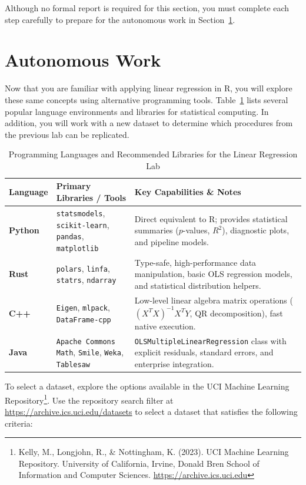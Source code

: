 \documentclass{article}
\begin{document}
Although no formal report is required for this section, you must complete each step carefully to prepare for the autonomous work in Section~\ref{sec:work}.

\section{Autonomous Work}
\label{sec:work}

Now that you are familiar with applying linear regression in R, you will explore these same concepts using alternative programming tools. Table~\ref{tab:languages} lists several popular language environments and libraries for statistical computing. In addition, you will work with a new dataset to determine which procedures from the previous lab can be replicated.

\begin{table}[htbp]
  \centering
  \caption{Programming Languages and Recommended Libraries for the Linear Regression Lab}
  \label{tab:languages}
  \small
  \begin{tabularx}{\textwidth}{l X X}
    \toprule
    \textbf{Language} & \textbf{Primary Libraries / Tools} & \textbf{Key Capabilities \& Notes} \\
    \midrule
    \textbf{Python} &
      \texttt{statsmodels}, \texttt{scikit-learn}, \texttt{pandas}, \texttt{matplotlib} &
      Direct equivalent to R; provides statistical summaries ($p$-values, $R^2$), diagnostic plots, and pipeline models. \\
    \addlinespace
    \textbf{Rust} &
      \texttt{polars}, \texttt{linfa}, \texttt{statrs}, \texttt{ndarray} &
      Type-safe, high-performance data manipulation, basic OLS regression models, and statistical distribution helpers. \\
    \addlinespace
    \textbf{C++} &
      \texttt{Eigen}, \texttt{mlpack}, \texttt{DataFrame-cpp} &
      Low-level linear algebra matrix operations ($(X^T X)^{-1} X^T Y$, QR decomposition), fast native execution. \\
    \addlinespace
    \textbf{Java} &
      \texttt{Apache Commons Math}, \texttt{Smile}, \texttt{Weka}, \texttt{Tablesaw} &
      \texttt{OLSMultipleLinearRegression} class with explicit residuals, standard errors, and enterprise integration. \\
    \bottomrule
  \end{tabularx}
\end{table}

To select a dataset, explore the options available in the UCI Machine Learning Repository\footnote{Kelly, M., Longjohn, R., \& Nottingham, K. (2023). UCI Machine Learning Repository. University of California, Irvine, Donald Bren School of Information and Computer Sciences. \url{https://archive.ics.uci.edu}}. Use the repository search filter at \url{https://archive.ics.uci.edu/datasets} to select a dataset that satisfies the following criteria:
\end{document}
